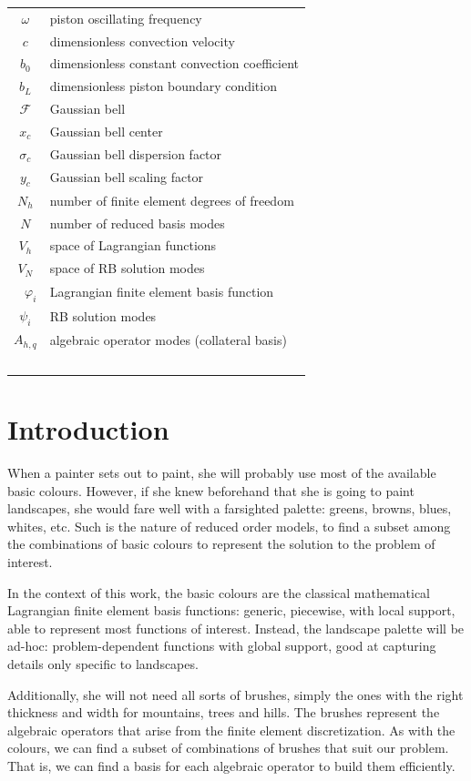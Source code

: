 \documentclass[thesis.tex]{subfiles}
\begin{document}
\begin{table}[h]
\begin{tabular}{cl}
        $\omega$ & piston oscillating frequency  \\
        $c$ & dimensionless convection velocity \\
        $b_0$ & dimensionless constant convection coefficient \\
        $b_L$ & dimensionless piston boundary condition \\
        $\mathcal{F}$ & Gaussian bell \\
        $x_c$ & Gaussian bell center \\
        $\sigma_c$ & Gaussian bell dispersion factor \\
        $y_c$ & Gaussian bell scaling factor \\
        $N_h$ & number of finite element degrees of freedom \\ 
        $N$ & number of reduced basis modes \\ 
        $V_h$ & space of Lagrangian functions\\ 
        $V_N$ & space of RB solution modes\\ 
        $\varphi_i$ & Lagrangian finite element basis function \\ 
        $\psi_i$ & RB solution modes \\
        $A_{h,q}$ & algebraic operator modes (collateral basis)\\ 
    \end{tabular}
\end{table}

\newpage 
\section{Introduction}
When a painter sets out to paint, she will probably use most of the available basic colours.
However, if she knew beforehand that she is going to paint landscapes, 
she would fare well with a farsighted palette: greens, browns, blues, whites, etc.
Such is the nature of reduced order models, 
to find a subset among the combinations of basic colours 
to represent the solution to the problem of interest.

In the context of this work, 
the basic colours are the classical mathematical Lagrangian finite element basis functions: 
generic, piecewise, with local support, able to represent most functions of interest.
Instead, the landscape palette will be ad-hoc:
problem-dependent functions with global support, 
good at capturing details only specific to landscapes.

Additionally, she will not need all sorts of brushes, 
simply the ones with the right thickness and width for mountains, trees and hills.
The brushes represent the algebraic operators that arise from the finite element discretization.
As with the colours, we can find a subset of combinations of brushes that suit our problem.
That is, we can find a basis for each algebraic operator to build them efficiently.
\end{document}

